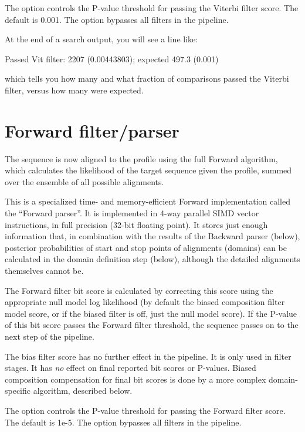 The  option controls the P-value threshold for passing
the Viterbi filter score. The default is 0.001.
The  option bypasses all filters in the pipeline.


At the end of a search output, you will see a line like:

\begin{sreoutput}
Passed Vit filter:                      2207  (0.00443803); expected 497.3 (0.001)
\end{sreoutput}

which tells you how many and what fraction of comparisons passed the
Viterbi filter, versus how many were expected.
 
  

\section{Forward filter/parser}

The sequence is now aligned to the profile using the full Forward
algorithm, which calculates the likelihood of the target sequence
given the profile, summed over the ensemble of all possible
alignments.

This is a specialized time- and memory-efficient Forward
implementation called the ``Forward parser''. It is implemented in
4-way parallel SIMD vector instructions, in full precision (32-bit
floating point). It stores just enough information that, in
combination with the results of the Backward parser (below), posterior
probabilities of start and stop points of alignments (domains) can be
calculated in the domain definition step (below), although the
detailed alignments themselves cannot be.

The Forward filter bit score is calculated by correcting this score
using the appropriate null model log likelihood (by default the biased
composition filter model score, or if the biased filter is off, just
the null model score). If the P-value of this bit score passes the
Forward filter threshold, the sequence passes on to the next step of
the pipeline.

The bias filter score has no further effect in the pipeline. It is
only used in filter stages. It has \emph{no} effect on final reported
bit scores or P-values. Biased composition compensation for final bit
scores is done by a more complex domain-specific algorithm, described
below.

The  option controls the P-value threshold for passing
the Forward filter score. The default is 1e-5.  The 
option bypasses all filters in the pipeline.

